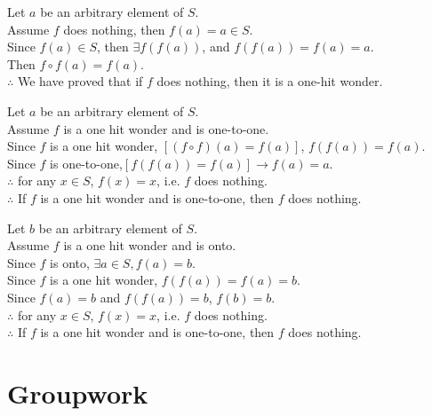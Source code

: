 \documentclass[12pt]{exam}
\newcounter{probnumcount}
\begin{document}
\begin{solution}
    \begin{qparts}
        \item
        Let $a$ be an arbitrary element of $S$.\\
        Assume $f$ does nothing, then $f(a) = a \in S$.
        \\Since $f(a) \in S$, then $\exists f(f(a))$, and $f(f(a)) = f(a) = a$.\\
        Then $f \circ f (a) = f(a)$.\\
        $\therefore$ We have proved that if $f$ does nothing, then it is a one-hit wonder.
    
        \item
        Let $a$ be an arbitrary element of $S$.\\
        Assume $f$ is a one hit wonder and is one-to-one.\\
        Since $f$ is a one hit wonder, $ [(f \circ f)(a) = f(a) ]$, $f(f(a)) = f(a)$.\\
        Since $f$ is one-to-one,$[f(f(a)) = f(a)] \rightarrow f(a) = a$.\\
        $\therefore$ for any $x \in S$, $f(x) = x$, i.e. $f$ does nothing.\\
        $\therefore$ If $f$ is a one hit wonder and is one-to-one, then $f$ does nothing.
    
        \item
        Let $b$ be an arbitrary element of $S$.\\
        Assume $f$ is a one hit wonder and is onto.\\
        Since $f$ is onto, $\exists a \in S,  f(a) = b$.\\
        Since $f$ is a one hit wonder, $f(f(a)) = f(a) = b$.\\
        Since $f(a) = b$ and $f(f(a)) = b$, $f(b)= b$.\\
        $\therefore$ for any $x \in S$, $f(x) = x$, i.e. $f$ does nothing.\\
        $\therefore$ If $f$ is a one hit wonder and is one-to-one, then $f$ does nothing.
    \end{qparts}
\end{solution}


\pagebreak
\setcounter{probnumcount}{1}
\section*{Groupwork}
\end{document}
